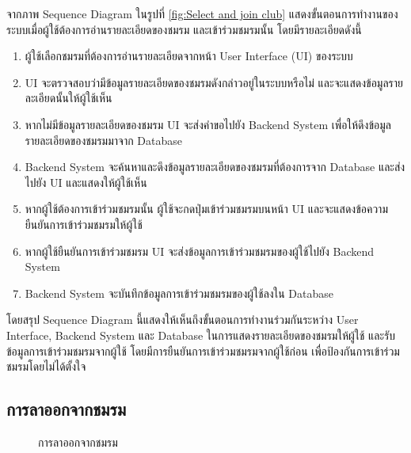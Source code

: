 \documentclass[14pt,oneside,openright,a4paper]{cpe-thai-project}
\begin{document}
  จากภาพ Sequence Diagram ในรูปที่ \ref{fig:Select and join club} แสดงขั้นตอนการทำงานของระบบเมื่อผู้ใช้ต้องการอ่านรายละเอียดของชมรม และเข้าร่วมชมรมนั้น โดยมีรายละเอียดดังนี้
  \begin{enumerate}
    \item ผู้ใช้เลือกชมรมที่ต้องการอ่านรายละเอียดจากหน้า User Interface (UI) ของระบบ
    \item UI จะตรวจสอบว่ามีข้อมูลรายละเอียดของชมรมดังกล่าวอยู่ในระบบหรือไม่ และจะแสดงข้อมูลรายละเอียดนั้นให้ผู้ใช้เห็น
    \item หากไม่มีข้อมูลรายละเอียดของชมรม UI จะส่งคำขอไปยัง Backend System เพื่อให้ดึงข้อมูลรายละเอียดของชมรมมาจาก Database
    \item Backend System จะค้นหาและดึงข้อมูลรายละเอียดของชมรมที่ต้องการจาก Database และส่งไปยัง UI และแสดงให้ผู้ใช้เห็น
    \item หากผู้ใช้ต้องการเข้าร่วมชมรมนั้น ผู้ใช้จะกดปุ่มเข้าร่วมชมรมบนหน้า UI และจะแสดงข้อความยืนยันการเข้าร่วมชมรมให้ผู้ใช้
    \item หากผู้ใช้ยืนยันการเข้าร่วมชมรม UI จะส่งข้อมูลการเข้าร่วมชมรมของผู้ใช้ไปยัง Backend System
    \item Backend System จะบันทึกข้อมูลการเข้าร่วมชมรมของผู้ใช้ลงใน Database
  \end{enumerate}

  โดยสรุป Sequence Diagram นี้แสดงให้เห็นถึงขั้นตอนการทำงานร่วมกันระหว่าง User Interface, Backend System และ Database ในการแสดงรายละเอียดของชมรมให้ผู้ใช้ และรับข้อมูลการเข้าร่วมชมรมจากผู้ใช้ โดยมีการยืนยันการเข้าร่วมชมรมจากผู้ใช้ก่อน เพื่อป้องกันการเข้าร่วมชมรมโดยไม่ได้ตั้งใจ


\subsection{การลาออกจากชมรม}

  \begin{figure}[!h]\centering
    \setlength{\fboxrule}{0.5mm} %
    \setlength{\fboxsep}{0.5cm}
    \caption{การลาออกจากชมรม}\label{fig:Club resignation}
  \end{figure}
\end{document}

